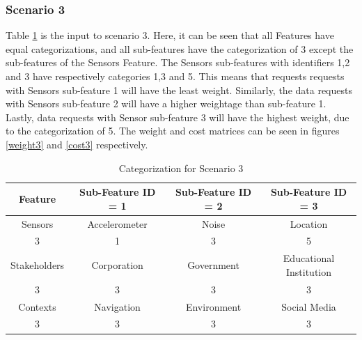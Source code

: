 \subsubsection{Scenario 3}
Table \ref{tab:scenario3} is the input to scenario 3. Here, it can be seen that all Features have equal categorizations, and
all sub-features have the categorization of 3 except the sub-features of the Sensors Feature. The Sensors sub-features with identifiers 1,2 and 3 have respectively categories 1,3 and 5. This means that requests requests with Sensors sub-feature 1 will have the least weight. Similarly, the data requests
with Sensors sub-feature 2 will have a higher weightage than sub-feature 1. Lastly, data requests with Sensor sub-feature 3 will have the highest weight, due to the categorization of 5. The weight and cost matrices can be seen in figures \ref{weight3} and \ref{cost3} respectively.

\begin{table}[h!]
  \centering
  \caption{Categorization for Scenario 3}
  \label{tab:scenario3}
  \begin{tabular}{cccc}
    \toprule
    Feature & Sub-Feature ID = 1 & Sub-Feature ID = 2 & Sub-Feature ID = 3\\
    \midrule
    Sensors & Accelerometer & Noise & Location\\
     3 & 1 & 3 & 5\\ \hhline{====}
     Stakeholders & Corporation & Government & Educational Institution\\
     3 & 3 & 3 & 3\\ \hhline{====}
     Contexts & Navigation & Environment & Social Media\\
     3 & 3 & 3 & 3\\ 
    \bottomrule
  \end{tabular}
\end{table}

